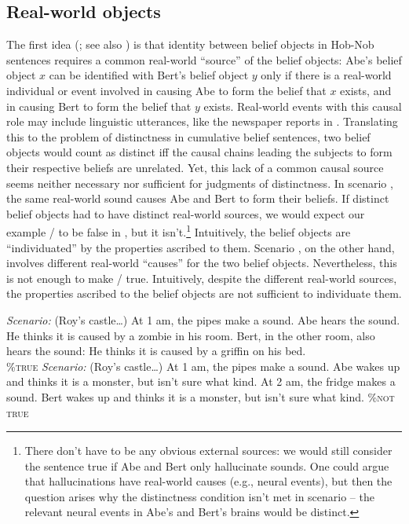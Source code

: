 \documentclass[output=paper]{langscibook}
\begin{document}
\subsection{Real-world objects}\label{sch-has:sec:4.1}

The first idea (\citealt{Rooy:1997,Dekker:1998}; see also \citealt{Cumming:2007}) is that identity between belief objects in Hob-Nob sentences requires a common real-world ``source'' of the belief objects: Abe's belief object $x$ can be identified with Bert's belief object $y$ only if there is a real-world individual or event  involved in causing Abe to form the belief that $x$ exists, and in causing Bert to form the belief that $y$ exists. Real-world events with this causal role may include linguistic utterances, like the newspaper reports in . Translating this to the problem of distinctness in cumulative belief sentences, two belief objects would count as distinct iff the causal chains leading the subjects to form their respective beliefs are unrelated. Yet,  this lack of a common causal source seems neither necessary nor sufficient for judgments of distinctness. In scenario , the same real-world sound causes Abe and Bert to form their beliefs. If distinct belief objects had to have distinct real-world sources,  we would expect our example / to be false in , but it isn't.\footnote{There don't have to be any obvious external sources: we would still consider the sentence true if Abe and Bert only hallucinate sounds. One could argue that hallucinations have  real-world causes (e.g., neural events), but then the question arises why the distinctness condition isn't met in scenario  -- the relevant neural events in Abe's and Bert's brains would be distinct.} Intuitively, the belief objects are ``individuated'' by the properties ascribed to them. Scenario , on the other hand, involves different real-world ``causes'' for the two belief objects. Nevertheless, this is not enough to make / true. Intuitively, despite the different real-world sources, the properties ascribed to the belief objects are not sufficient to individuate them.

\eanoraggedright \label{sch-has:ex:50} \textit{Scenario:} (Roy's castle\ldots) At 1 am, the pipes make a sound. Abe hears the sound. He thinks  it is caused by a zombie in his room. Bert, in the other room, also hears the sound: He thinks it is caused by a griffin on his bed. \\\null\hfill  {} \textsc{\%true}\ex \label{sch-has:ex:51} \textit{Scenario:} (Roy's castle\ldots) At 1 am, the pipes make a sound. Abe wakes up and thinks it is a monster, but isn't sure what kind. At 2 am, the fridge makes a sound. Bert wakes up and thinks it is a monster, but isn't sure what kind.\hfill {} \textsc{\%not true} \z
\end{document}
